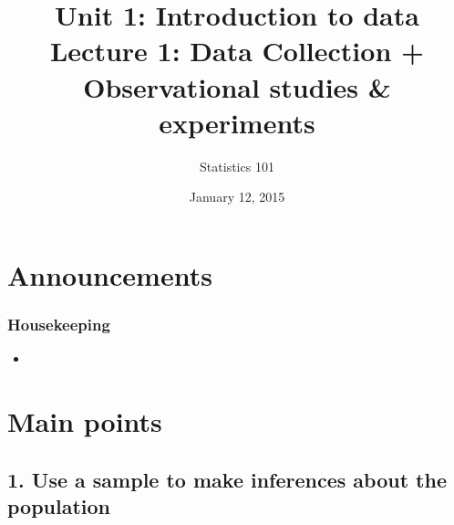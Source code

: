 \documentclass[slidestop,compress,mathserif,12pt,t,professionalfonts,xcolor=table]{beamer}
\title{Unit 1: Introduction to data \\ Lecture 1: Data Collection + Observational studies \& experiments}
\author{Statistics 101}
\date{January 12, 2015}
\institute{Dr. \c{C}etinkaya-Rundel}
\begin{document}



\begin{frame}[plain]

\titlepage
\addtocounter{framenumber}{-1} 

\end{frame}


\section{Announcements}


\begin{frame}
\frametitle{Housekeeping}

\begin{itemize}

\item 

\end{itemize}

\end{frame}


\section{Main points}


\subsection{1. Use a sample to make inferences about the population}

\end{document}
